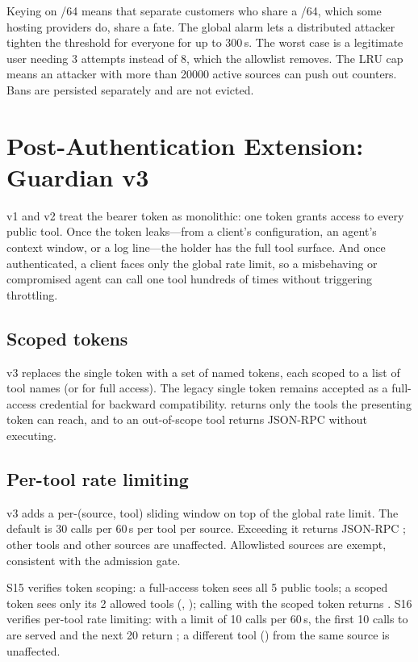 \documentclass[10pt,twocolumn]{article}
\begin{document}
 Keying on /64 means that separate customers who share a
/64, which some hosting providers do, share a fate. The global alarm lets a
distributed attacker tighten the threshold for everyone for up to 300\,s. The
worst case is a legitimate user needing 3 attempts instead of 8, which the
allowlist removes. The LRU cap means an attacker with more than \num{20000}
active sources can push out counters. Bans are persisted separately and are
not evicted.

\section{Post-Authentication Extension: Guardian v3}\label{sec:v3}
v1 and v2 treat the bearer token as monolithic: one token grants access to
every public tool. Once the token leaks---from a client's configuration, an
agent's context window, or a log line---the holder has the full tool surface.
And once authenticated, a client faces only the global rate limit, so a
misbehaving or compromised agent can call one tool hundreds of times without
triggering throttling.

\subsection{Scoped tokens}
v3 replaces the single token with a set of named tokens, each scoped to a list
of tool names (or \code{["*"]} for full access). The legacy single token remains
accepted as a full-access credential for backward compatibility.
 returns only the tools the presenting token can reach, and
 to an out-of-scope tool returns JSON-RPC 
without executing.

\subsection{Per-tool rate limiting}
v3 adds a per-(source, tool) sliding window on top of the global rate limit.
The default is 30 calls per 60\,s per tool per source. Exceeding it returns
JSON-RPC ; other tools and other sources are unaffected.
Allowlisted sources are exempt, consistent with the admission gate.

S15 verifies token scoping: a full-access token sees all 5 public tools; a
scoped token sees only its 2 allowed tools (,
); calling  with the scoped token
returns . S16 verifies per-tool rate limiting: with a limit of
10 calls per 60\,s, the first 10 calls to  are served
and the next 20 return ; a different tool
() from the same source is unaffected.
\end{document}
